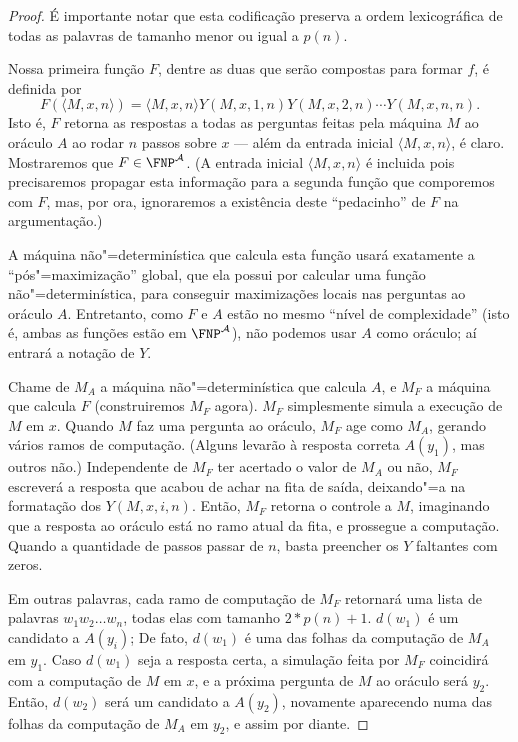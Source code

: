 \begin{proof}
    É importante notar que esta codificação
    preserva a ordem lexicográfica de todas as palavras
    de tamanho menor ou igual a $p(n)$.

    Nossa primeira função $F$,
    dentre as duas que serão compostas para formar $f$,
    é definida por
    \begin{equation*}
        F(\langle M, x, n \rangle) = \langle M, x, n \rangle
            Y(M, x, 1, n) Y(M, x, 2, n) \cdots Y(M, x, n, n).
    \end{equation*}
    Isto é,
    $F$ retorna as respostas a todas as perguntas feitas pela máquina $M$ ao oráculo $A$
    ao rodar $n$ passos sobre $x$
    --- além da entrada inicial $\langle M, x, n \rangle$, é claro.
    Mostraremos que $F \in \FNP^\mathcal A$.
    (A entrada inicial $\langle M, x, n \rangle$
    é incluida pois precisaremos propagar esta informação para a segunda função
    que comporemos com $F$,
    mas, por ora,
    ignoraremos a existência deste ``pedacinho'' de $F$ na argumentação.)

    A máquina não"=determinística que calcula esta função
    usará exatamente a ``pós"=maximização'' global,
    que ela possui por calcular uma função não"=determinística,
    para conseguir maximizações locais nas perguntas ao oráculo $A$.
    Entretanto,
    como $F$ e $A$ estão no mesmo ``nível de complexidade''
    (isto é, ambas as funções estão em $\FNP^\mathcal A$),
    não podemos usar $A$ como oráculo;
    aí entrará a notação de $Y$.

    Chame de $M_A$ a máquina não"=determinística que calcula $A$,
    e $M_F$ a máquina que calcula $F$
    (construiremos $M_F$ agora).
    $M_F$ simplesmente simula a execução de $M$ em $x$.
    Quando $M$ faz uma pergunta ao oráculo,
    $M_F$ age como $M_A$,
    gerando vários ramos de computação.
    (Alguns levarão à resposta correta $A(y_1)$,
    mas outros não.)
    Independente de $M_F$ ter acertado o valor de $M_A$ ou não,
    $M_F$ escreverá a resposta que acabou de achar na fita de saída,
    deixando"=a na formatação dos $Y(M, x, i, n)$.
    Então, $M_F$ retorna o controle a $M$,
    imaginando que a resposta ao oráculo está no ramo atual da fita,
    e prossegue a computação.
    Quando a quantidade de passos passar de $n$,
    basta preencher os $Y$ faltantes com zeros.

    Em outras palavras,
    cada ramo de computação de $M_F$
    retornará uma lista de palavras $w_1 w_2 \dots w_n$,
    todas elas com tamanho $2*p(n)+1$.
    $d(w_1)$ é um candidato a $A(y_i)$;
    De fato, $d(w_1)$ é uma das folhas da computação de $M_A$ em $y_1$.
    Caso $d(w_1)$ seja a resposta certa,
    a simulação feita por $M_F$
    coincidirá com a computação de $M$ em $x$,
    e a próxima pergunta de $M$ ao oráculo será $y_2$.
    Então, $d(w_2)$ será um candidato a $A(y_2)$,
    novamente aparecendo numa das folhas da computação de $M_A$ em $y_2$,
    e assim por diante.


\end{proof}
